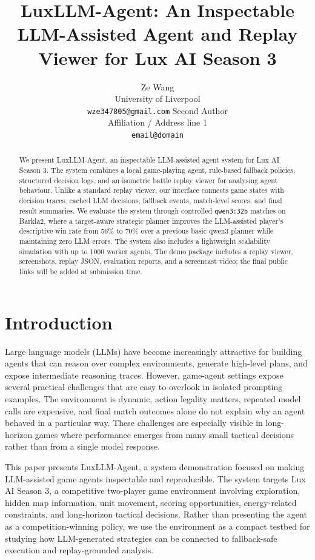 \documentclass[11pt]{article}
\title{LuxLLM-Agent: An Inspectable LLM-Assisted Agent and Replay Viewer for Lux AI Season 3}
\author{
  Ze Wang \\
  University of Liverpool \\
  \texttt{wze347805@gmail.com}
  \And
  Second Author \\
  Affiliation / Address line 1 \\
  \texttt{email@domain}
}
\begin{document}
\maketitle

\begin{abstract}
We present LuxLLM-Agent, an inspectable LLM-assisted agent system for Lux AI Season 3. The system combines a local game-playing agent, rule-based fallback policies, structured decision logs, and an isometric battle replay viewer for analysing agent behaviour. Unlike a standard replay viewer, our interface connects game states with decision traces, cached LLM decisions, fallback events, match-level scores, and final result summaries. We evaluate the system through controlled \texttt{qwen3:32b} matches on Barkla2, where a target-aware strategic planner improves the LLM-assisted player's descriptive win rate from 56\% to 70\% over a previous basic qwen3 planner while maintaining zero LLM errors. The system also includes a lightweight scalability simulation with up to 1000 worker agents. The demo package includes a replay viewer, screenshots, replay JSON, evaluation reports, and a screencast video; the final public links will be added at submission time.
\end{abstract}

\section{Introduction}

Large language models (LLMs) have become increasingly attractive for building agents that can reason over complex environments, generate high-level plans, and expose intermediate reasoning traces. However, game-agent settings expose several practical challenges that are easy to overlook in isolated prompting examples. The environment is dynamic, action legality matters, repeated model calls are expensive, and final match outcomes alone do not explain why an agent behaved in a particular way. These challenges are especially visible in long-horizon games where performance emerges from many small tactical decisions rather than from a single model response.

This paper presents LuxLLM-Agent, a system demonstration focused on making LLM-assisted game agents inspectable and reproducible. The system targets Lux AI Season 3, a competitive two-player game environment involving exploration, hidden map information, unit movement, scoring opportunities, energy-related constraints, and long-horizon tactical decisions. Rather than presenting the agent as a competition-winning policy, we use the environment as a compact testbed for studying how LLM-generated strategies can be connected to fallback-safe execution and replay-grounded analysis.
\end{document}
